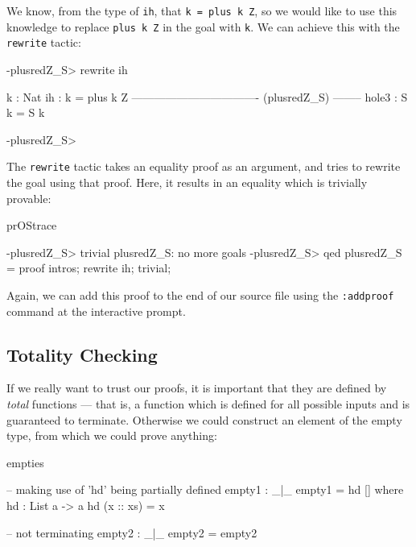 \noindent
We know, from the type of \texttt{ih}, that \texttt{k = plus k Z}, so we would like to
use this knowledge to replace \texttt{plus k Z} in the goal with \texttt{k}. We can
achieve this with the \texttt{rewrite} tactic:

\begin{SaveVerbatim}{}

-plusredZ_S> rewrite ih

  k : Nat
  ih : k = plus k Z
---------------------------------- (plusredZ_S) --------
{hole3} : S k = S k

-plusredZ_S>

\end{SaveVerbatim}
\useverb{}

\noindent
The \texttt{rewrite} tactic takes an equality proof as an argument, and tries to rewrite
the goal using that proof. Here, it results in an equality which is trivially provable:

\begin{SaveVerbatim}{prOStrace}

-plusredZ_S> trivial
plusredZ_S: no more goals
-plusredZ_S> qed
plusredZ_S = proof {
    intros;
    rewrite ih;
    trivial;
}

\end{SaveVerbatim}

\noindent
Again, we can add this proof to the end of our source file using the \texttt{:addproof}
command at the interactive prompt.

\subsection{Totality Checking}

\label{sect:totality}

If we really want to trust our proofs, it is important that they are defined by
\emph{total} functions --- that is, a function which is defined for all
possible inputs and is guaranteed to terminate. Otherwise we could construct an
element of the empty type, from which we could prove anything:

\begin{SaveVerbatim}{empties}

-- making use of 'hd' being partially defined
empty1 : _|_
empty1 = hd [] where
    hd : List a -> a
    hd (x :: xs) = x

-- not terminating
empty2 : _|_
empty2 = empty2

\end{SaveVerbatim}

